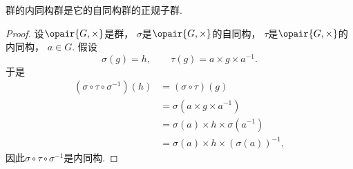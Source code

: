 \begin{theorem}
群的内同构群是它的自同构群的正规子群.
\begin{proof}
设\(\opair{G,\times}\)是群，
\(\sigma\)是\(\opair{G,\times}\)的自同构，
\(\tau\)是\(\opair{G,\times}\)的内同构，
\(a\in G\).
假设\[
	\sigma(g)=h, \qquad
	\tau(g)=a\times g\times a^{-1}.
\]
于是\begin{align*}
	(\sigma\circ\tau\circ\sigma^{-1})(h)
	&= (\sigma\circ\tau)(g) \\
	&= \sigma(a\times g\times a^{-1}) \\
	&= \sigma(a)\times h\times\sigma(a^{-1}) \\
	&= \sigma(a)\times h\times(\sigma(a))^{-1},
\end{align*}
因此\(\sigma\circ\tau\circ\sigma^{-1}\)是内同构.
\end{proof}
\end{theorem}
